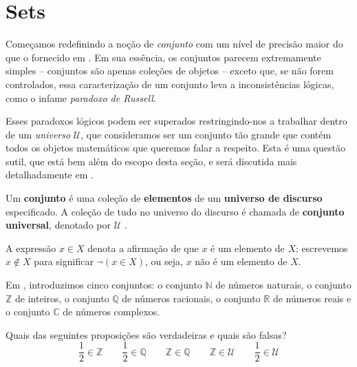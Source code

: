 \section{Sets}

Começamos redefinindo a noção de \textit{conjunto} com um nível de precisão maior do que o fornecido em . Em sua essência, os conjuntos parecem extremamente simples – conjuntos são apenas coleções de objetos – exceto que, se não forem controlados, essa caracterização de um conjunto leva a inconsistências lógicas, como o infame \textit{paradoxo de Russell}.

Esses paradoxos lógicos podem ser superados restringindo-nos a trabalhar dentro de um \textit{universo} $\mathcal{U}$, que consideramos ser um conjunto tão grande que contém todos os objetos matemáticos que queremos falar a respeito. Esta é uma questão sutil, que está bem além do escopo desta seção, e será discutida mais detalhadamente em .

\begin{definition}
\label{defSet}
Um \textbf{conjunto} é uma coleção de \textbf{elementos} de um \textbf{universo de discurso} especificado. A coleção de tudo no universo do discurso é chamada de \textbf{conjunto universal}, denotado por $\mathcal{U}$ .

A expressão $x \in X$  denota a afirmação de que $x$ é um elemento de $X$; escrevemos $x \not \in X$  para significar $\neg (x \in X)$, ou seja, $x$ não é um elemento de $X$.
\end{definition}

\begin{example}
Em , introduzimos cinco conjuntos: o conjunto $\mathbb{N}$ de números naturais, o conjunto $\mathbb{Z}$ de inteiros, o conjunto $\mathbb{Q}$ de números racionais, o conjunto $\mathbb{R}$ de números reais e o conjunto $\mathbb{C}$ de números complexos.
\end{example}

\begin{exercise}
Quais das seguintes proposições são verdadeiras e quais são falsas?
\[ \frac{1}{2} \in \mathbb{Z} \qquad \frac{1}{2} \in \mathbb{Q} \qquad \mathbb{Z} \in \mathbb{Q} \qquad \mathbb{Z} \in \mathcal{U} \qquad \frac{1}{2} \in \mathcal{U} \] 
\end{exercise}

